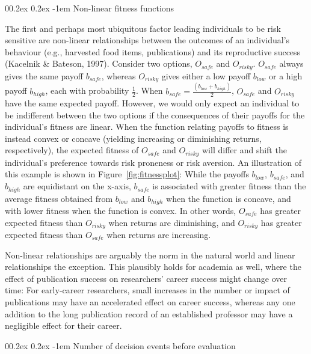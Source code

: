 \documentclass[
  british,
  a4paper,
  ,man,mask,floatsintext]{apa6}
\makeatletter
\let\oldparagraph\paragraph
\renewcommand{\paragraph}{
    \@ifstar
      \xxxParagraphStar
      \xxxParagraphNoStar
  }
\newcommand{\xxxParagraphStar}[1]{\oldparagraph*{#1}\mbox{}}
\newcommand{\xxxParagraphNoStar}[1]{\oldparagraph{#1}\mbox{}}
\renewcommand{\paragraph}{\@startsection{paragraph}{4}{\parindent}%
  {0\baselineskip \@plus 0.2ex \@minus 0.2ex}%
  {-1em}%
  {\normalfont\normalsize\bfseries\itshape\typesectitle}}
\makeatother
\begin{document}
\paragraph{Non-linear fitness functions}\label{non-linear-fitness-functions}

The first and perhaps most ubiquitous factor leading individuals to be risk sensitive are non-linear relationships between the outcomes of an individual's behaviour (e.g., harvested food items, publications) and its reproductive success (Kacelnik \& Bateson, 1997).
Consider two options, \(O_{safe}\) and \(O_{risky}\).
\(O_{safe}\) always gives the same payoff \(b_{safe}\), whereas \(O_{risky}\) gives either a low payoff \(b_{low}\) or a high payoff \(b_{high}\), each with probability \(\frac{1}{2}\).
When \(b_{safe} = \frac{(b_{low} + b_{high})}{2}\), \(O_{safe}\) and \(O_{risky}\) have the same expected payoff.
However, we would only expect an individual to be indifferent between the two options if the consequences of their payoffs for the individual's fitness are linear.
When the function relating payoffs to fitness is instead convex or concave (yielding increasing or diminishing returns, respectively), the expected fitness of \(O_{safe}\) and \(O_{risky}\) will differ and shift the individual's preference towards risk proneness or risk aversion.
An illustration of this example is shown in Figure~\ref{fig:fitnessplot}:
While the payoffs \(b_{low}\), \(b_{safe}\), and \(b_{high}\) are equidistant on the x-axis, \(b_{safe}\) is associated with greater fitness than the average fitness obtained from \(b_{low}\) and \(b_{high}\) when the function is concave, and with lower fitness when the function is convex.
In other words, \(O_{safe}\) has greater expected fitness than \(O_{risky}\) when returns are diminishing, and \(O_{risky}\) has greater expected fitness than \(O_{safe}\) when returns are increasing.

Non-linear relationships are arguably the norm in the natural world and linear relationships the exception.
This plausibly holds for academia as well, where the effect of publication success on researchers' career success might change over time:
For early-career researchers, small increases in the number or impact of publications may have an accelerated effect on career success, whereas any one addition to the long publication record of an established professor may have a negligible effect for their career.

\paragraph{Number of decision events before evaluation}\label{number-of-decision-events-before-evaluation}
\end{document}

